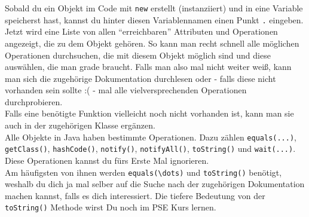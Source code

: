 \begin{Infobox}[Autocompletion]
	\label{autocompletions}
    Sobald du ein Objekt im Code mit \lstinline{new} erstellt (instanziiert) und in eine Variable speicherst hast, kannst du hinter diesen Variablennamen einen Punkt \lstinline{.} eingeben.\\
    Jetzt wird eine Liste von allen \enquote{erreichbaren} Attributen und Operationen angezeigt, die zu dem Objekt gehören.
    So kann man recht schnell alle möglichen Operationen durchsuchen, die mit diesem Objekt möglich sind und diese auswählen, die man grade braucht. Falls man also mal nicht weiter weiß, kann man sich die zugehörige Dokumentation durchlesen oder - falls diese nicht vorhanden sein sollte :( - mal alle vielversprechenden Operationen durchprobieren.\\
	Falls eine benötigte Funktion vielleicht noch nicht vorhanden ist, kann man sie auch in der zugehörigen Klasse ergänzen.\\

    Alle Objekte in Java haben bestimmte Operationen. Dazu zählen \lstinline{equals(...)}, \lstinline{getClass()}, \lstinline{hashCode()}, \lstinline{notify()}, \lstinline{notifyAll()}, \lstinline{toString()} und \lstinline{wait(...)}.\\
    Diese Operationen kannst du fürs Erste Mal ignorieren.\\
    Am häufigsten von ihnen werden \lstinline{equals(\dots)} und \lstinline{toString()} benötigt, weshalb du dich ja mal selber auf die Suche nach der zugehörigen Dokumentation machen kannst, falls es dich interessiert. Die tiefere Bedeutung von der \lstinline{toString()} Methode wirst Du noch im PSE Kurs lernen.
\end{Infobox}

